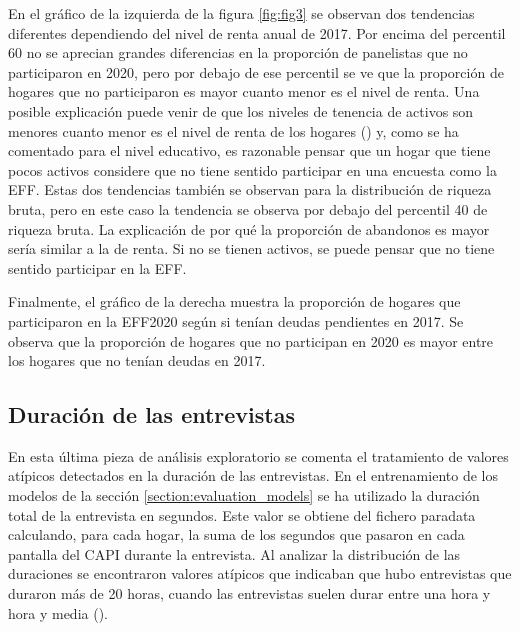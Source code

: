 En el gráfico de la izquierda de la figura \ref{fig:fig3} se observan dos tendencias diferentes dependiendo del nivel de renta anual de 2017. Por encima del percentil 60 no se aprecian grandes diferencias en la proporción de panelistas que no participaron en 2020, pero por debajo de ese percentil se ve que la proporción de hogares que no participaron es mayor cuanto menor es el nivel de renta. Una posible explicación puede venir de que los niveles de tenencia de activos son menores cuanto menor es el nivel de renta de los hogares (\cite{eff2017results}) y, como se ha comentado para el nivel educativo, es razonable pensar que un hogar que tiene pocos activos considere que no tiene sentido participar en una encuesta como la EFF. Estas dos tendencias también se observan para la distribución de riqueza bruta, pero en este caso la tendencia se observa por debajo del percentil 40 de riqueza bruta. La explicación de por qué la proporción de abandonos es mayor sería similar a la de renta. Si no se tienen activos, se puede pensar que no tiene sentido participar en la EFF.

Finalmente, el gráfico de la derecha muestra la proporción de hogares que participaron en la EFF2020 según si tenían deudas pendientes en 2017. Se observa que la proporción de hogares que no participan en 2020 es mayor entre los hogares que no tenían  deudas en 2017.

\subsection*{Duración de las entrevistas}
\label{subsection:duration}

En esta última pieza de análisis exploratorio se comenta el tratamiento de valores atípicos detectados en la duración de las entrevistas. En el entrenamiento de los modelos de la sección \ref{section:evaluation_models} se ha utilizado la duración total de la entrevista en segundos. Este valor se obtiene del fichero paradata calculando, para cada hogar, la suma de los segundos que pasaron en cada pantalla del CAPI durante la entrevista. Al analizar la distribución de las duraciones se encontraron valores atípicos que indicaban que hubo entrevistas que duraron más de 20 horas, cuando las entrevistas suelen durar entre una hora y hora y media (\cite{effmethod2017}).

